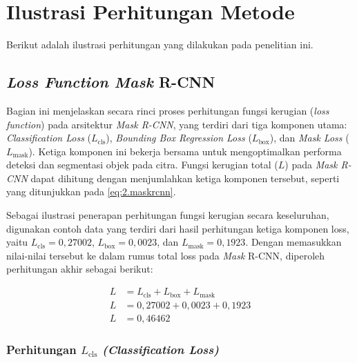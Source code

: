 \section{Ilustrasi Perhitungan Metode} \label{III.Ilustrasi}
Berikut adalah ilustrasi perhitungan yang dilakukan pada penelitian ini. \par

\subsection{\textit{Loss Function Mask} R-CNN}
Bagian ini menjelaskan secara rinci proses perhitungan fungsi kerugian (\textit{loss function}) pada arsitektur \textit{Mask R-CNN}, yang terdiri dari tiga komponen utama: \textit{Classification Loss} ($L_{\text{cls}}$), \textit{Bounding Box Regression Loss} ($L_{\text{box}}$), dan \textit{Mask Loss} ($L_{\text{mask}}$). Ketiga komponen ini bekerja bersama untuk mengoptimalkan performa deteksi dan segmentasi objek pada citra. 
Fungsi kerugian total ($L$) pada \textit{Mask R-CNN} dapat dihitung dengan menjumlahkan ketiga komponen tersebut, seperti yang ditunjukkan pada \ref{eq:2.maskrcnn}. \par


Sebagai ilustrasi penerapan perhitungan fungsi kerugian secara keseluruhan, digunakan contoh data yang terdiri dari hasil perhitungan ketiga komponen loss, yaitu $L_{\text{cls}} = 0{,}27002$, $L_{\text{box}} = 0{,}0023$, dan $L_{\text{mask}} = 0{,}1923$. Dengan memasukkan nilai-nilai tersebut ke dalam rumus total loss pada \textit{Mask} R-CNN, diperoleh perhitungan akhir sebagai berikut: \par

\begin{align*}
    L &= L_{\text{cls}} + L_{\text{box}} + L_{\text{mask}} \\[0.5em]
    L &= 0{,}27002 + 0{,}0023 + 0{,}1923 \\[0.5em]
    L &= 0{,}46462
\end{align*}

\subsubsection{Perhitungan $L_{\text{cls}}$ \textit{(Classification Loss)}}

